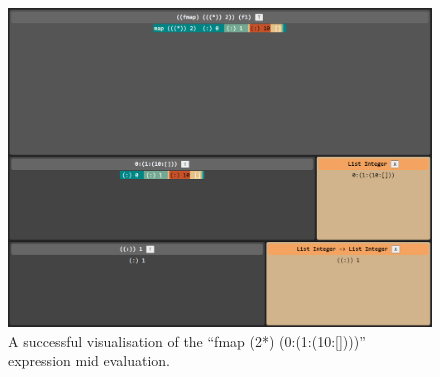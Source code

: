 \begin{figure}
    \centering
    \includegraphics[width=1\linewidth]{chapters/6-testing/figures/vis.png}
    \caption{A successful visualisation of the ``fmap (2*) (0:(1:(10:[])))'' expression mid evaluation.}
    \label{fig:vis}
\end{figure}